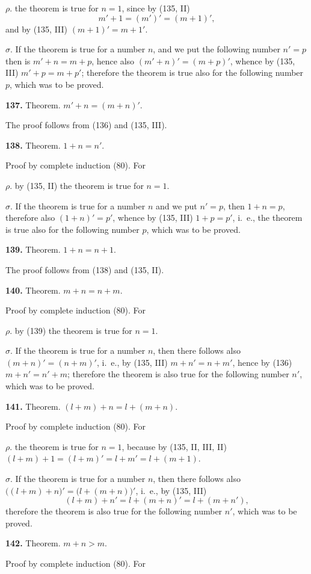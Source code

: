 \documentclass[oneside]{book}
\newcommand\mypara{\medskip\textbf}
\begin{document}
$\rho$. the theorem is true for $n=1$, since by (135, II)
\[
m'+1=(m')'=(m+1)',
\]
and by (135, III) $(m+1)'=m+1'$.


$\sigma$. If the theorem is true for a number $n$, and we
put the following number $n'=p$ then is $m'+n=
m+p$, hence also $(m'+n)'=(m+p)'$, whence by (135,
III) $m'+p=m+p'$; therefore the theorem is true
also for the following number $p$, which was to be
proved.

\mypara{137.} Theorem. $m'+n=(m+n)'$.

The proof follows from (136) and (135, III).

\mypara{138.} Theorem. $1+n=n'$.

Proof by complete induction (80). For

$\rho$. by (135, II) the theorem is true for $n=1$.

$\sigma$. If the theorem is true for a number $n$ and we
put $n'=p$, then $1+n=p$, therefore also $(1+n)'=p'$,
whence by (135, III) $1+p=p'$, i.~e., the theorem is
true also for the following number $p$, which was to be
proved.

\mypara{139.} Theorem. $1+n=n+1$.

The proof follows from (138) and (135, II).

\mypara{140.} Theorem. $m+n=n+m$.

Proof by complete induction (80). For

$\rho$. by (139) the theorem is true for $n=1$.

$\sigma$. If the theorem is true for a number $n$, then there
follows also $(m+n)'=(n+m)'$, i.~e., by (135, III)
$m+n'=n+m'$, hence by (136) $m+n'=n'+m$; therefore
the theorem is also true for the following number
$n'$, which was to be proved.

\mypara{141.} Theorem. $(l+m)+n=l+(m+n)$.

Proof by complete induction (80). For

$\rho$. the theorem is true for $n=1$, because by (135,
II, III, II) $(l+m)+1=(l+m)'=l+m'=l+(m+1)$.

$\sigma$. If the theorem is true for a number $n$, then there
follows also $\bigl((l+m)+n\bigr)'=\bigl(l+(m+n)\bigr)'$, i.~e., by
(135, III)
\[
(l+m)+n'=l+(m+n)'=l+(m+n'),
\]
therefore the theorem is also true for the following
number $n'$, which was to be proved.

\mypara{142.} Theorem.  $m+n>m$.

Proof by complete induction (80). For
\end{document}
